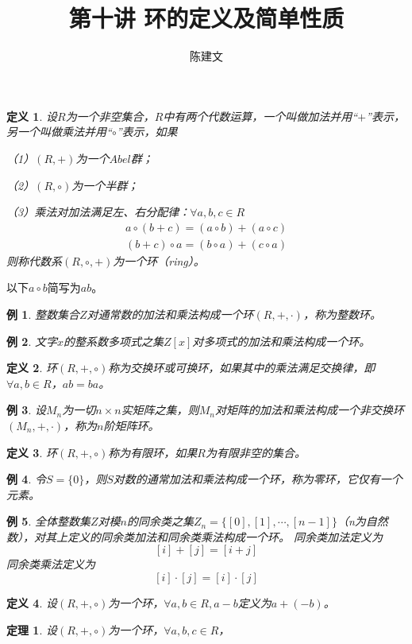 \documentclass{article}
\newtheorem{Def}{定义}
\newtheorem{Thm}{定理}
\newtheorem*{Example}{例}
\begin{document}
\begin{CJK*}{UTF8}{gbsn}
  \title{第十讲 环的定义及简单性质}
  \author{陈建文}
  \maketitle
  
\begin{Def}
  设$R$为一个非空集合，$R$中有两个代数运算，一个叫做加法并用“$+$”表示，另一个叫做乘法并用“$\circ$”表示，如果

  （1）$(R,+)$为一个$Abel$群；

  （2）$(R,\circ)$为一个半群；

  （3）乘法对加法满足左、右分配律：$\forall a,b,c\in R$
\begin{align*}
  a\circ(b+c)=(a\circ b)+(a\circ c)\\
  (b+c)\circ a=(b\circ a) + (c\circ a)
\end{align*}
则称代数系$(R,\circ,+)$为一个环（ring）。
\end{Def}
以下$a\circ b$简写为$ab$。
\begin{Example}
  整数集合$Z$对通常数的加法和乘法构成一个环$(R,+,\cdot)$，称为整数环。
\end{Example}

\begin{Example}
  文字$x$的整系数多项式之集$Z[x]$对多项式的加法和乘法构成一个环。
\end{Example}

\begin{Def}
环$(R,+,\circ)$称为交换环或可换环，如果其中的乘法满足交换律，即$\forall a,b\in R$，$ab=ba$。
\end{Def}

\begin{Example}
  设$M_n$为一切$n\times n$实矩阵之集，则$M_n$对矩阵的加法和乘法构成一个非交换环$(M_n,+,\cdot)$，称为$n$阶矩阵环。
\end{Example}

\begin{Def}
  环$(R,+,\circ)$称为有限环，如果$R$为有限非空的集合。
\end{Def}
\begin{Example}
  令$S=\{0\}$，则$S$对数的通常加法和乘法构成一个环，称为零环，它仅有一个元素。
\end{Example}
\begin{Example}
  全体整数集$Z$对模$n$的同余类之集$Z_n=\{[0],[1],\cdots,[n-1]\}$（n为自然数），对其上定义的同余类加法和同余类乘法构成一个环。
  同余类加法定义为
  \[[i]+[j]=[i+j]\]
  同余类乘法定义为
  \[[i]\cdot [j]=[i]\cdot[j]\]
\end{Example}
\begin{Def}
  设$(R,+,\circ)$为一个环，$\forall a,b\in R,a-b$定义为$a+(-b)$。
\end{Def}
\begin{Thm}
  设$(R,+,\circ)$为一个环，$\forall a,b,c\in R$，


\end{Thm}
\end{CJK*}
\end{document}
